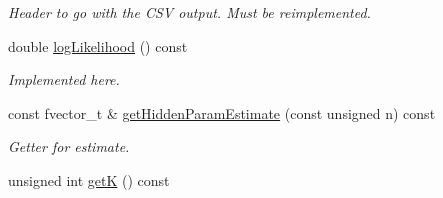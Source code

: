 \begin{DoxyCompactItemize}
\begin{DoxyCompactList}\small\item\em Header to go with the CSV output. Must be reimplemented. \item\end{DoxyCompactList}\item 
double \hyperlink{classCDA_1_1FitMulticlassByEM_abaea206aef382360246cf2a64dadc74c}{logLikelihood} () const 
\begin{DoxyCompactList}\small\item\em Implemented here. \item\end{DoxyCompactList}\item 
const fvector\_\-t \& \hyperlink{classCDA_1_1FitMulticlassByEM_ae5a9232f142123c9ffaf6ec956b44f00}{getHiddenParamEstimate} (const unsigned n) const 
\begin{DoxyCompactList}\small\item\em Getter for estimate. \item\end{DoxyCompactList}\item 
\hypertarget{classCDA_1_1FitMulticlassByEM_ae6b0acc500e8360bee6f8e3434b6b197}{
unsigned int \hyperlink{classCDA_1_1FitMulticlassByEM_ae6b0acc500e8360bee6f8e3434b6b197}{getK} () const }
\label{classCDA_1_1FitMulticlassByEM_ae6b0acc500e8360bee6f8e3434b6b197}


\end{DoxyCompactItemize}
